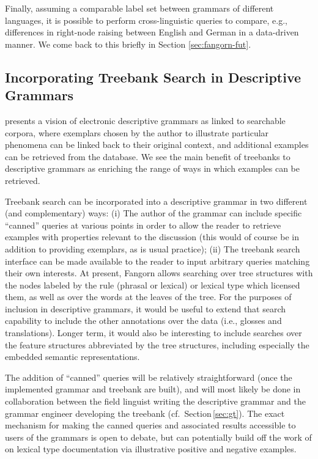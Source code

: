 \documentclass[12pt]{article}
\newcommand{\sref}[1]{Section$\,$\ref{#1}}
\begin{document}
Finally, assuming a comparable label set between grammars of different
languages, it is possible to perform cross-linguistic queries to
compare, e.g., differences in right-node raising between English and
German in a data-driven manner. We come back to this briefly in Section \ref{sec:fangorn-fut}.



\subsection{Incorporating Treebank Search in Descriptive Grammars}

 presents a vision of electronic descriptive
grammars as linked to searchable corpora, where exemplars chosen
by the author to illustrate particular phenomena can be linked
back to their original context, and additional examples can
be retrieved from the database.  We see the main benefit of treebanks
to descriptive grammars as enriching the range of ways in which 
examples can be retrieved.  

Treebank search can be incorporated into a descriptive grammar
in two different (and complementary) ways:  (i) The author of the grammar
can include specific ``canned'' queries at various points in order to allow
the reader to retrieve examples with properties relevant to
the discussion  (this would of course be in addition to providing
exemplars, as is usual practice); (ii) The treebank search interface
can be made available to the reader to input arbitrary queries
matching their own interests.  At present, Fangorn allows searching
over tree structures with the nodes labeled by the rule (phrasal or lexical)
or lexical type which licensed them, as well as over the words at
the leaves of the tree.  
For the purposes of inclusion in descriptive grammars, it would be
useful to extend that search capability to include the other
annotations over the data (i.e., glosses and translations).  Longer
term, it would also be interesting to include searches over the
feature structures abbreviated by the tree structures, including
especially the embedded semantic representations.

The addition of ``canned'' queries will be relatively straightforward
(once the implemented grammar and treebank are built), and will most
likely be done in collaboration between the field linguist writing the
descriptive grammar and the grammar engineer developing the treebank
(cf.\ \sref{sec:gt}). The exact mechanism for making the canned queries
and associated results accessible to users of the grammars is open to
debate, but can potentially build off the work of
 on lexical type documentation via
illustrative positive and negative examples.
\end{document}

